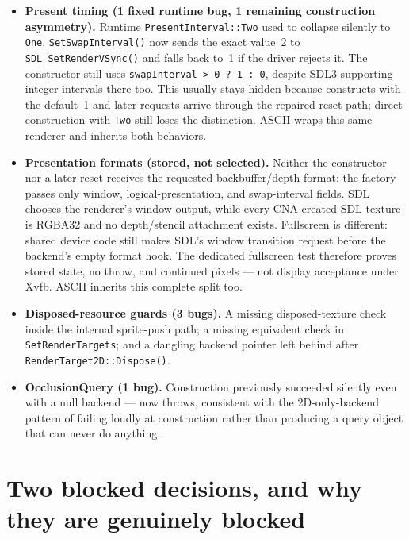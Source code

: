 \begin{itemize}
        proves the first two with pixels, but its ``every bind'' wording omits CNA's divergence
        from FNA: a redundant bind clears again here, while FNA returns early.
  \item \textbf{Present timing (1 fixed runtime bug, 1 remaining construction asymmetry).}
        Runtime \texttt{PresentInterval::Two} used to collapse silently to
        \texttt{One}. \texttt{SetSwapInterval()} now sends the exact value~2 to
        \texttt{SDL\_SetRenderVSync()} and falls back to~1 if the driver rejects it. The
        constructor still uses \texttt{swapInterval > 0 ? 1 : 0}, despite SDL3 supporting
        integer intervals there too. This usually stays hidden because 
        constructs with the default~1 and later requests arrive through the repaired reset
        path; direct  construction with \texttt{Two} still loses the
        distinction. ASCII wraps this same renderer and inherits both behaviors.
  \item \textbf{Presentation formats (stored, not selected).} Neither the constructor nor a
        later reset receives the requested backbuffer/depth format: the factory passes only
        window, logical-presentation, and swap-interval fields. SDL chooses the renderer's
        window output, while every CNA-created SDL texture is RGBA32 and no depth/stencil
        attachment exists. Fullscreen is different: shared device code still makes SDL's
        window transition request before the backend's empty format hook.
        The dedicated fullscreen test therefore proves stored state, no throw, and continued
        pixels --- not display acceptance under Xvfb. ASCII inherits this complete split too.
  \item \textbf{Disposed-resource guards (3 bugs).} A missing disposed-texture check inside
        the internal sprite-push path; a missing equivalent check in
        \texttt{SetRenderTargets}; and a dangling backend pointer left behind after
        \texttt{RenderTarget2D::Dispose()}.
  \item \textbf{OcclusionQuery (1 bug).} Construction previously succeeded silently even with
        a null backend --- now throws, consistent with the 2D-only-backend pattern of
        failing loudly at construction rather than producing a query object that can never
        do anything.
\end{itemize}

\section{Two blocked decisions, and why they are genuinely blocked}

